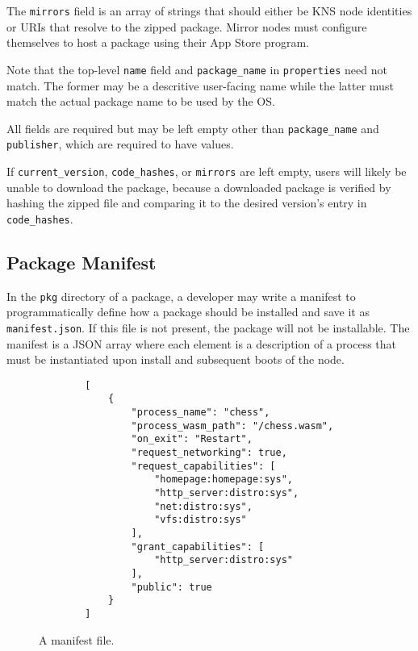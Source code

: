 \documentclass[runningheads]{llncs}
\begin{document}
The \verb|mirrors| field is an array of strings that should either be KNS node identities or URIs that resolve to the zipped package.
Mirror nodes must configure themselves to host a package using their App Store program.

Note that the top-level \verb|name| field and \verb|package_name| in \verb|properties| need not match. The former may be a descritive user-facing name while the latter must match the actual package name to be used by the OS.

All fields are required but may be left empty other than \verb|package_name| and \verb|publisher|, which are required to have values.

If \verb|current_version|, \verb|code_hashes|, or \verb|mirrors| are left empty, users will likely be unable to download the package, because a downloaded package is verified by hashing the zipped file and comparing it to the desired version's entry in \verb|code_hashes|.

\subsection{Package Manifest}
\label{sec:packagemanagermanifest}

In the \verb|pkg| directory of a package, a developer may write a manifest to programmatically define how a package should be installed and save it as \verb|manifest.json|.
If this file is not present, the package will not be installable.
The manifest is a JSON array where each element is a description of a process that must be instantiated upon install and subsequent boots of the node.

\begin{figure}[H]
    \centering
    \begin{verbatim}
        [
            {
                "process_name": "chess",
                "process_wasm_path": "/chess.wasm",
                "on_exit": "Restart",
                "request_networking": true,
                "request_capabilities": [
                    "homepage:homepage:sys",
                    "http_server:distro:sys",
                    "net:distro:sys",
                    "vfs:distro:sys"
                ],
                "grant_capabilities": [
                    "http_server:distro:sys"
                ],
                "public": true
            }
        ]
    \end{verbatim}
    \caption{A manifest file.}
    \label{fig:example manifest.json}
\end{figure}
\end{document}

